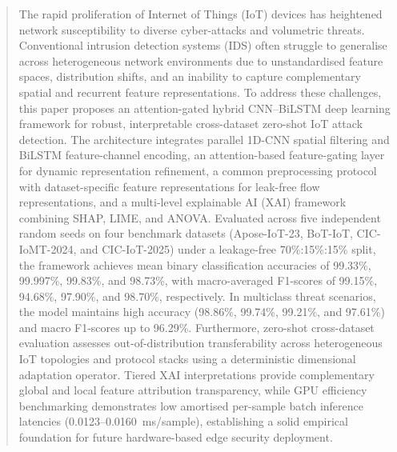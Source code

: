 \documentclass[a4paper,fleqn]{cas-sc}
\begin{document}









\begin{abstract}
The rapid proliferation of Internet of Things (IoT) devices has heightened network susceptibility to diverse cyber-attacks and volumetric threats. Conventional intrusion detection systems (IDS) often struggle to generalise across heterogeneous network environments due to unstandardised feature spaces, distribution shifts, and an inability to capture complementary spatial and recurrent feature representations. To address these challenges, this paper proposes an attention-gated hybrid CNN--BiLSTM deep learning framework for robust, interpretable cross-dataset zero-shot IoT attack detection. The architecture integrates parallel 1D-CNN spatial filtering and BiLSTM feature-channel encoding, an attention-based feature-gating layer for dynamic representation refinement, a common preprocessing protocol with dataset-specific feature representations for leak-free flow representations, and a multi-level explainable AI (XAI) framework combining SHAP, LIME, and ANOVA. Evaluated across five independent random seeds on four benchmark datasets (Apose-IoT-23, BoT-IoT, CIC-IoMT-2024, and CIC-IoT-2025) under a leakage-free 70\%:15\%:15\% split, the framework achieves mean binary classification accuracies of 99.33\%, 99.997\%, 99.83\%, and 98.73\%, with macro-averaged F1-scores of 99.15\%, 94.68\%, 97.90\%, and 98.70\%, respectively. In multiclass threat scenarios, the model maintains high accuracy (98.86\%, 99.74\%, 99.21\%, and 97.61\%) and macro F1-scores up to 96.29\%. Furthermore, zero-shot cross-dataset evaluation assesses out-of-distribution transferability across heterogeneous IoT topologies and protocol stacks using a deterministic dimensional adaptation operator. Tiered XAI interpretations provide complementary global and local feature attribution transparency, while GPU efficiency benchmarking demonstrates low amortised per-sample batch inference latencies (0.0123--0.0160~ms/sample), establishing a solid empirical foundation for future hardware-based edge security deployment.
\end{abstract}
\end{document}
